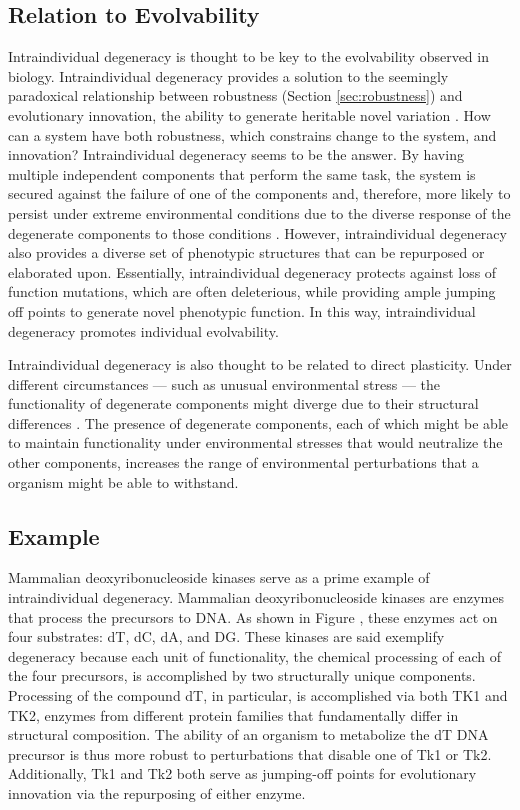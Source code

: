 \subsection{Relation to Evolvability}
Intraindividual degeneracy is thought to be key to the evolvability observed in biology. Intraindividual degeneracy provides a solution to the seemingly paradoxical relationship between robustness (Section \ref{sec:robustness}) and evolutionary innovation, the ability to generate heritable novel variation \cite{Whitacre2010Degeneracy:Evolvability}. How can a system have both robustness, which constrains change to the system, and innovation? Intraindividual degeneracy seems to be the answer. By having multiple independent components that perform the same task, the system is secured against the failure of one of the components and, therefore, more likely to persist under extreme environmental conditions due to the diverse response of the degenerate components to those conditions \cite{Whitacre2010Degeneracy:Evolvability}. However, intraindividual degeneracy also provides a diverse set of phenotypic structures that can be repurposed or elaborated upon. Essentially, intraindividual degeneracy protects against loss of function mutations, which are often deleterious, while providing ample jumping off points to generate novel phenotypic function. In this way, intraindividual degeneracy promotes individual evolvability.

Intraindividual degeneracy is also thought to be related to direct plasticity. Under different circumstances --- such as unusual environmental stress --- the functionality of degenerate components might diverge due to their structural differences  \cite{Richter2015EvolvabilitySurvey}. The presence of degenerate components, each of which might be able to maintain functionality under environmental stresses that would neutralize the other components, increases the range of environmental perturbations that a organism might be able to withstand.
 
\subsection{Example}
Mammalian deoxyribonucleoside kinases serve as a prime example of intraindividual degeneracy.
Mammalian deoxyribonucleoside kinases are enzymes that process the precursors to DNA.
As shown in Figure , these enzymes act on four substrates: dT, dC, dA, and DG.
These kinases are said exemplify degeneracy because each unit of functionality, the chemical processing of each of the four precursors, is accomplished by two structurally unique components. Processing of the compound dT, in particular, is accomplished via both TK1 and TK2, enzymes from different protein families that fundamentally differ in structural composition. The ability of an organism to metabolize the dT DNA precursor is thus more robust to perturbations that disable one of Tk1 or Tk2. Additionally, Tk1 and Tk2 both serve as jumping-off points for evolutionary innovation via the repurposing of either enzyme.

